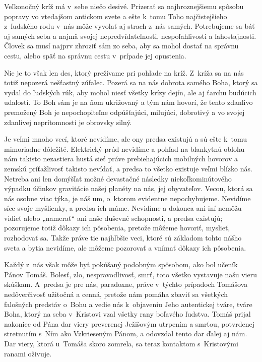 


Veľkonočný kríž má v~sebe niečo desivé. Prizerať sa najhroznejšiemu spôsobu popravy vo vtedajšom antickom svete a ešte k~tomu Toho najčistejšieho z~ľudského rodu v~nás môže vyvolať aj strach z~nás samých. Potrebujeme sa báť aj samých seba a najmä svojej nepredvídateľnosti, nespoľahlivosti a ľahostajnosti. Človek sa musí najprv zhroziť sám zo seba, aby sa mohol dostať na správnu cestu, alebo späť na správnu cestu v~prípade jej opustenia.

Nie je to však len des, ktorý prežívame pri pohľade na kríž. Z~kríža sa na nás totiž nepozerá nešťastný  zúfalec. Pozerá sa na nás dobrota samého Boha, ktorý sa vydal do ľudských rúk, aby mohol niesť všetky krízy dejín, ale aj ťarchu budúcich udalostí. To Boh sám je na ňom ukrižovaný a tým nám hovorí, že tento zdanlivo premožený Boh je nepochopiteľne odpúšťajúci, milujúci, dobrotivý a vo svojej zdanlivej neprítomnosti je obrovsky silný.

Je veľmi mnoho vecí, ktoré nevidíme, ale ony predsa existujú a sú ešte k~tomu mimoriadne dôležité. Elektrický prúd nevidíme a pohľad na blankytnú oblohu nám takisto nezastiera hustá sieť práve prebiehajúcich mobilných hovorov a zemskú príťažlivosť takisto nevídať, a predsa to všetko existuje veľmi blízko nás. Netreba ani len domýšľať možné devastačné následky niekoľkominútového výpadku účinkov gravitácie našej planéty na nás, jej obyvateľov. Vecou, ktorá sa nás osobne viac týka, je náš um, o~ktorom evidentne nepochybujeme. Nevidíme síce svoje myšlienky, a predsa ich máme. Nevidíme a dokonca ani iní nemôžu vidieť alebo „namerať“ ani naše duševné schopnosti, a predsa existujú; pozorujeme totiž dôkazy ich pôsobenia, pretože môžeme hovoriť, myslieť, rozhodovať sa. Takže práve tie najhlbšie veci, ktoré sú základom tohto nášho sveta a bytia nevidíme, ale môžeme pozorovať a vnímať dôkazy ich pôsobenia.

Každý z~nás však môže byť pokúšaný podobným spôsobom, ako bol učeník Pánov Tomáš. Bolesť, zlo, nespravodlivosť, smrť, toto všetko vystavuje našu vieru skúškam. A~predsa je pre nás, paradoxne, práve v~týchto prípadoch Tomášova nedôverčivosť užitočná a cenná, pretože nám pomáha zbaviť sa  všetkých falošných predstáv o~Bohu a vedie nás k~objaveniu Jeho autentickej tváre, tváre Boha, ktorý na seba v~Kristovi vzal všetky rany boľavého ľudstva. Tomáš prijal nakoniec od Pána dar viery preverenej Ježišovým utrpením a smrťou, potvrdenej stretnutím s~Ním ako Vzkrieseným Pánom, a odovzdal tento dar ďalej aj nám. Dar viery, ktorá u~Tomáša skoro zomrela, sa teraz kontaktom s~Kristovými ranami oživuje.

